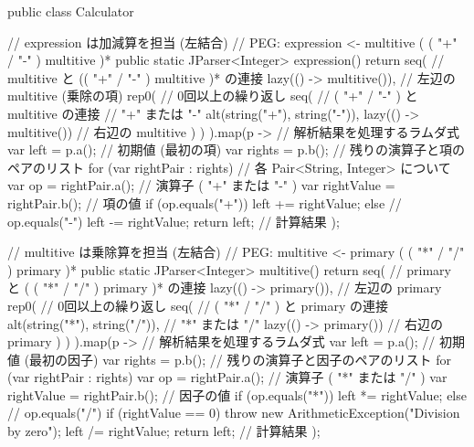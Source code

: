 \begin{codescreen}{}
public class Calculator {
    // expression は加減算を担当 (左結合)
    // PEG: expression <- multitive ( ( "+" / "-" ) multitive )*
    public static JParser<Integer> expression() {
        return seq( // multitive と (( "+" / "-" ) multitive )* の連接
            lazy(() -> multitive()), // 左辺の multitive (乗除の項)
            rep0( // 0回以上の繰り返し
                seq( // ( "+" / "-" ) と multitive の連接
                    // "+" または "-"
                    alt(string("+"), string("-")), 
                    lazy(() -> multitive()) // 右辺の multitive
                )
            )
        ).map(p -> { // 解析結果を処理するラムダ式
            var left = p.a(); // 初期値 (最初の項)
            var rights = p.b(); // 残りの演算子と項のペアのリスト
            for (var rightPair : rights) { 
                                // 各 Pair<String, Integer> について
                var op = rightPair.a(); // 演算子 ( "+" または "-" )
                var rightValue = rightPair.b(); // 項の値
                if (op.equals("+")) {
                    left += rightValue;
                } else { // op.equals("-")
                    left -= rightValue;
                }
            }
            return left; // 計算結果
        });
    }

    // multitive は乗除算を担当 (左結合)
    // PEG: multitive <- primary ( ( "*" / "/" ) primary )*
    public static JParser<Integer> multitive() {
        return seq( // primary と ( ( "*" / "/" ) primary )* の連接
            lazy(() -> primary()), // 左辺の primary
            rep0( // 0回以上の繰り返し
                seq( // ( "*" / "/" ) と primary の連接
                    alt(string("*"), string("/")), // "*" または "/"
                    lazy(() -> primary()) // 右辺の primary
                )
            )
        ).map(p -> { // 解析結果を処理するラムダ式
            var left = p.a(); // 初期値 (最初の因子)
            var rights = p.b(); // 残りの演算子と因子のペアのリスト
            for (var rightPair : rights) {
                var op = rightPair.a(); // 演算子 ( "*" または "/" )
                var rightValue = rightPair.b(); // 因子の値
                if (op.equals("*")) {
                    left *= rightValue;
                } else { // op.equals("/")
                    if (rightValue == 0) 
                        throw new ArithmeticException("Division by zero"); 
                    left /= rightValue;
                }
            }
            return left; // 計算結果
        });
    }

}
\end{codescreen}
